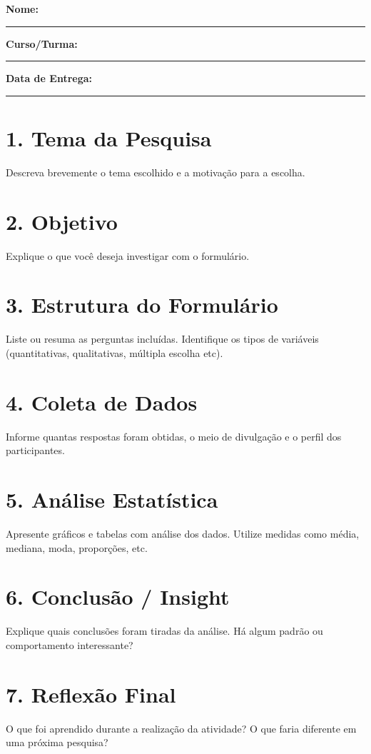 \documentclass[12pt,a4paper]{article}
\begin{document}
\hfill
\vspace{1cm}

\textbf{Nome:} \rule{10cm}{0.4pt}

\textbf{Curso/Turma:} \rule{8cm}{0.4pt}

\textbf{Data de Entrega:} \rule{6cm}{0.4pt}

\vspace{1cm}

\section*{1. Tema da Pesquisa}
Descreva brevemente o tema escolhido e a motivação para a escolha.

\section*{2. Objetivo}
Explique o que você deseja investigar com o formulário.

\section*{3. Estrutura do Formulário}
Liste ou resuma as perguntas incluídas. Identifique os tipos de variáveis (quantitativas, qualitativas, múltipla escolha etc).

\section*{4. Coleta de Dados}
Informe quantas respostas foram obtidas, o meio de divulgação e o perfil dos participantes.

\section*{5. Análise Estatística}
Apresente gráficos e tabelas com análise dos dados. Utilize medidas como média, mediana, moda, proporções, etc.

\section*{6. Conclusão / Insight}
Explique quais conclusões foram tiradas da análise. Há algum padrão ou comportamento interessante?

\section*{7. Reflexão Final}
O que foi aprendido durante a realização da atividade? O que faria diferente em uma próxima pesquisa?
\end{document}
